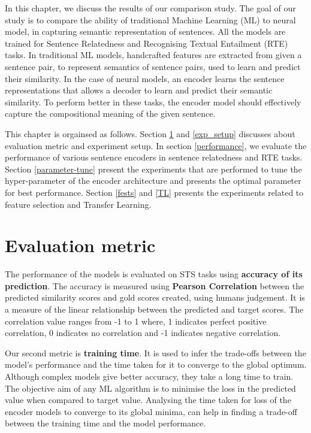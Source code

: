 \documentclass[12pt]{report} %
\begin{document}
 In this chapter, we discuss the results of our comparison study. The goal of our study is to compare the ability of traditional Machine Learning (ML) to neural model, in capturing semantic representation of sentences. All the models are trained for Sentence Relatedness and Recognising Textual Entailment (RTE) tasks. In traditional ML models, handcrafted features are extracted from given a sentence pair, to represent semantics of sentence pairs, used to learn and predict their similarity. In the case of neural models, an encoder learns the sentence representations that allows a decoder to learn and predict their semantic similarity. %
 To perform better in these tasks, the encoder model should effectively capture the compositional meaning of the given sentence. 
 
 This chapter is orgainsed as follows. Section \ref{eval} and \ref{exp_setup} discusses about evaluation metric and experiment setup. In section \ref{performance}, we evaluate the performance of various sentence encoders in sentence relatedness and RTE tasks. Section \ref{parameter-tune} present the experiments that are performed to tune the hyper-parameter of the encoder architecture and presents the optimal parameter for best performance. Section \ref{fests} and \ref{TL} presents the experiments related to feature selection and Transfer Learning.
 
 \section{Evaluation metric}
 \label{eval}
 
 The performance of the models is evaluated on STS tasks using \textbf{accuracy of its prediction}. The accuracy is measured using \textbf{Pearson Correlation} between the predicted similarity scores and gold scores created, using humans judgement. 
 It is a measure of the linear relationship between the predicted and target scores. The correlation value ranges from -1 to 1 where, 1 indicates perfect positive correlation, 0 indicates no correlation and -1 indicates negative correlation.
 
 Our second metric is \textbf{training time}. It is used to infer the trade-offs between the model's performance and the time taken for it to converge to the global optimum. Although complex models give better accuracy, they take a long time to train. The objective aim of any ML algorithm is to minimise the loss in the predicted value when compared to target value. Analysing the time taken for loss of the encoder models to converge to its global minima, can help in finding a trade-off between the training time and the model performance. 
 
\end{document}
